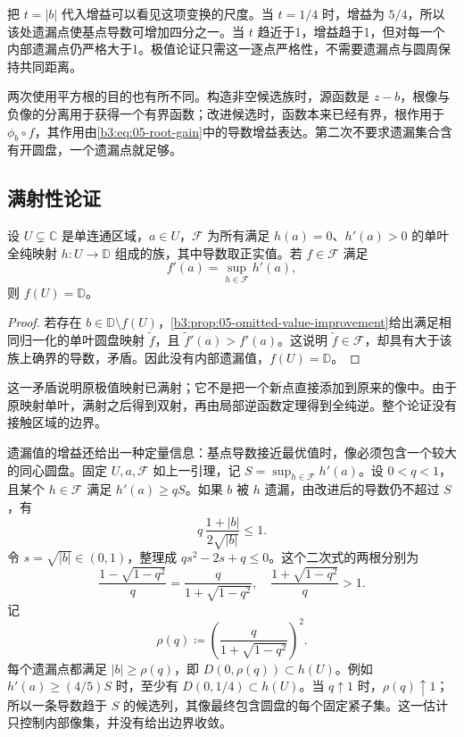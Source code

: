 \ProseParagraphBreak

把 \(t=|b|\) 代入增益可以看见这项变换的尺度。当 \(t=1/4\) 时，增益为 \(5/4\)，所以该处遗漏点使基点导数可增加四分之一。当 \(t\) 趋近于1，增益趋于1，但对每一个内部遗漏点仍严格大于1。极值论证只需这一逐点严格性，不需要遗漏点与圆周保持共同距离。

\ProseParagraphBreak

两次使用平方根的目的也有所不同。构造非空候选族时，源函数是 \(z-b\)，根像与负像的分离用于获得一个有界函数；改进候选时，函数本来已经有界，根作用于 \(\phi_b\circ f\)，其作用由\eqref{b3:eq:05-root-gain}中的导数增益表达。第二次不要求遗漏集合含有开圆盘，一个遗漏点就足够。

\subsection{满射性论证}
\label{b3:subsec:050204}

\begin{lemma}[极值映射的满射性]\label{b3:lem:05-extremal-surjective}
设 \(U\subsetneq\mathbb C\) 是单连通区域，\(a\in U\)，\(\mathcal F\) 为所有满足 \(h(a)=0\)、\(h'(a)>0\) 的单叶全纯映射 \(h:U\to\mathbb D\) 组成的族，其中导数取正实值。若 \(f\in\mathcal F\) 满足
\[
 f'(a)=\sup_{h\in\mathcal F}h'(a),
\]
则 \(f(U)=\mathbb D\)。
\end{lemma}
\begin{proof}
若存在 \(b\in\mathbb D\setminus f(U)\)，\cref{b3:prop:05-omitted-value-improvement}给出满足相同归一化的单叶圆盘映射 \(\widetilde f\)，且 \(\widetilde f'(a)>f'(a)\)。这说明 \(\widetilde f\in\mathcal F\)，却具有大于该族上确界的导数，矛盾。因此没有内部遗漏值，\(f(U)=\mathbb D\)。
\end{proof}

这一矛盾说明原极值映射已满射；它不是把一个新点直接添加到原来的像中。由于原映射单叶，满射之后得到双射，再由局部逆函数定理得到全纯逆。整个论证没有接触区域的边界。

\ProseParagraphBreak

遗漏值的增益还给出一种定量信息：基点导数接近最优值时，像必须包含一个较大的同心圆盘。固定 \(U,a,\mathcal F\) 如上一引理，记 \(S=\sup_{h\in\mathcal F}h'(a)\)。设 \(0<q<1\)，且某个 \(h\in\mathcal F\) 满足 \(h'(a)\ge qS\)。如果 \(b\) 被 \(h\) 遗漏，由改进后的导数仍不超过 \(S\)，有
\[
 q\,\frac{1+|b|}{2\sqrt{|b|}}\le1.
\]
令 \(s=\sqrt{|b|}\in(0,1)\)，整理成 \(qs^2-2s+q\le0\)。这个二次式的两根分别为
\[
 \frac{1-\sqrt{1-q^2}}q
 =\frac q{1+\sqrt{1-q^2}},
 \quad
 \frac{1+\sqrt{1-q^2}}q>1.
\]
记
\[
 \rho(q)\coloneqq
 \left(\frac q{1+\sqrt{1-q^2}}\right)^2.
\]
每个遗漏点都满足 \(|b|\ge\rho(q)\)，即 \(D(0,\rho(q))\subset h(U)\)。例如 \(h'(a)\ge(4/5)S\) 时，至少有 \(D(0,1/4)\subset h(U)\)。当 \(q\uparrow1\) 时，\(\rho(q)\uparrow1\)；所以一条导数趋于 \(S\) 的候选列，其像最终包含圆盘的每个固定紧子集。这一估计只控制内部像集，并没有给出边界收敛。
